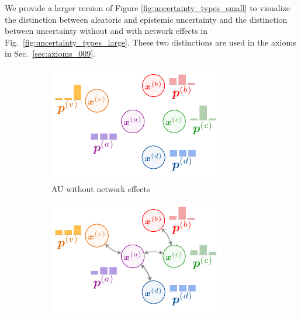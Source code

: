 We provide a larger version of Figure \ref{fig:uncertainty_types_small} to visualize the distinction between aleatoric and epistemic uncertainty and the distinction between uncertainty without and with network effects in Fig.~\ref{fig:uncertainty_types_large}. These two distinctions are used in the axioms in Sec.~\ref{sec:axioms_009}.

\begin{figure}[!h]
\centering
	\begin{subfigure}[t]{0.495\textwidth}
	    \centering
		\includegraphics[width=\textwidth]{sections/009_neurips2021/resources/no-network-aleatoric.pdf}
		\caption{AU without network effects} 
		\label{subfig:au_without_network_large}
	\end{subfigure}
	\begin{subfigure}[t]{0.495\textwidth}
	    \centering
		\includegraphics[width=\textwidth]{sections/009_neurips2021/resources/network-aleatoric.pdf}

\end{subfigure}
\end{figure}

